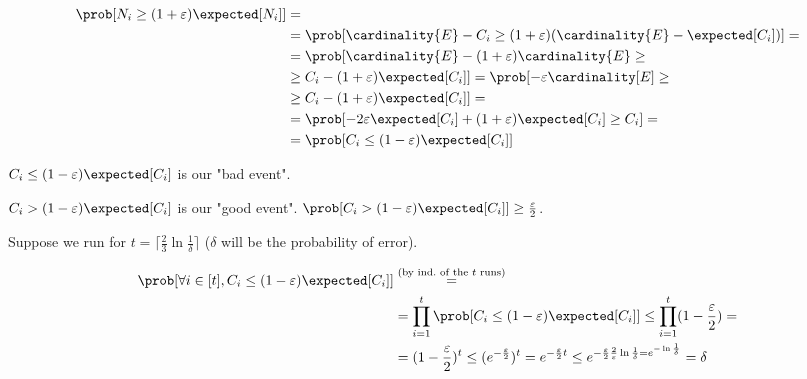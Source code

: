     \begin{equation*}
        \begin{split}
            \prob[N_i \geq (1+\varepsilon)\expected[N_i]]   &=\\
                                                            &= \prob[\cardinality{E} - C_i \geq (1+\varepsilon)(\cardinality{E} - \expected[C_i])] =\\
                                                            &= \prob[\cardinality{E} - (1 + \varepsilon) \cardinality{E} \geq\\
                                                            &\geq C_i - (1 + \varepsilon) \expected[C_i]] = \prob[- \varepsilon \cardinality[E] \geq\\
                                                            &\geq C_i - (1 + \varepsilon) \expected[C_i]] =\\
                                                            &= \prob[-2 \varepsilon \expected[C_i] + (1+\varepsilon) \expected[C_i] \geq C_i] =\\
                                                            &= \prob[C_i \leq (1-\varepsilon) \expected[C_i]]
        \end{split}
    \end{equation*}

    $C_i \leq (1-\varepsilon) \expected[C_i]$ is our "bad event".

    $C_i > (1-\varepsilon) \expected[C_i]$ is our "good event". $\prob[C_i > (1-\varepsilon) \expected[C_i]] \geq \frac{\varepsilon}{2}$.

    Suppose we run for $t = \lceil\frac{2}{3} \ln \frac{1}{\delta} \rceil $ ($\delta$ will be the probability of error).


    \begin{equation*}
        \begin{split}
            \prob[\forall i \in [t], C_i \leq (1-\varepsilon) \expected[C_i]] &\overset{(\text{by ind.~of the } t \text{ runs})}{=}\\
                &=\prod_{i = 1}^t \prob[C_i \leq (1 - \varepsilon) \expected[C_i]] \leq \prod_{i = 1}^t (1 - \frac{\varepsilon}{2}) =\\
                &= (1 - \frac{\varepsilon}{2})^t \leq (e^{- \frac{\varepsilon}{2}})^t = e^{-\frac{\varepsilon}{2}t} \leq  e^{-\frac{\varepsilon}{2} \frac{2}{\varepsilon} \ln \frac{1}{\delta} = e^{- \ln \frac{1}{\delta}} } = \delta
        \end{split}
    \end{equation*}


